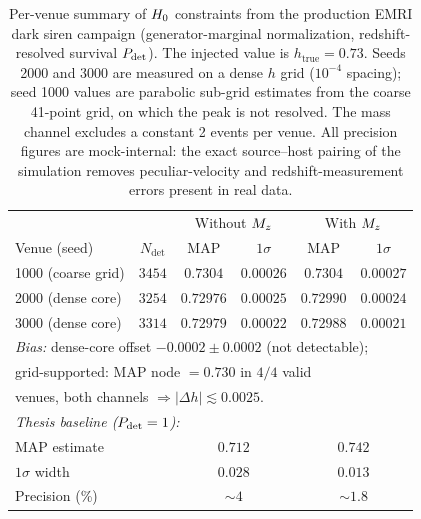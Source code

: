 \begin{table}[t]
  \caption{Per-venue summary of $H_0$ constraints from the production
  EMRI dark siren campaign (generator-marginal normalization,
  redshift-resolved survival $P_\mathrm{det}$). The injected value is
  $h_\mathrm{true} = 0.73$. Seeds 2000 and 3000 are measured on a
  dense $h$ grid ($10^{-4}$ spacing); seed 1000 values are parabolic
  sub-grid estimates from the coarse 41-point grid, on which the peak
  is not resolved. The mass channel excludes a constant 2 events per
  venue. All precision figures are mock-internal: the exact
  source--host pairing of the simulation removes peculiar-velocity
  and redshift-measurement errors present in real data.}
  \label{tab:results_summary}
  \centering
  \setlength{\tabcolsep}{2.5pt}
  \begin{tabular}{l c c c c c}
    \hline\hline
    & & \multicolumn{2}{c}{Without $M_z$}
      & \multicolumn{2}{c}{With $M_z$} \\
    Venue (seed) & $N_\mathrm{det}$ & MAP & $1\sigma$ & MAP & $1\sigma$ \\
    \hline
    1000 (coarse grid) & $3454$ & $0.7304$ & $0.00026$
      & $0.7304$ & $0.00027$ \\
    2000 (dense core)  & $3254$ & $0.72976$ & $0.00025$
      & $0.72990$ & $0.00024$ \\
    3000 (dense core)  & $3314$ & $0.72979$ & $0.00022$
      & $0.72988$ & $0.00021$ \\
    \hline
    \multicolumn{6}{l}{\emph{Bias:} dense-core offset
      $-0.0002 \pm 0.0002$ (not detectable);} \\
    \multicolumn{6}{l}{grid-supported: MAP node $= 0.730$ in $4/4$
      valid} \\
    \multicolumn{6}{l}{venues, both channels
      $\Rightarrow |\Delta h| \lesssim 0.0025$.} \\
    \hline
    \multicolumn{6}{l}{\emph{Thesis baseline ($P_\mathrm{det} = 1$):}} \\
    MAP estimate & & \multicolumn{2}{c}{$0.712$}
      & \multicolumn{2}{c}{$0.742$} \\
    $1\sigma$ width & & \multicolumn{2}{c}{$0.028$}
      & \multicolumn{2}{c}{$0.013$} \\
    Precision (\%) & & \multicolumn{2}{c}{$\sim 4$}
      & \multicolumn{2}{c}{$\sim 1.8$} \\
    \hline\hline
  \end{tabular}
\end{table}

